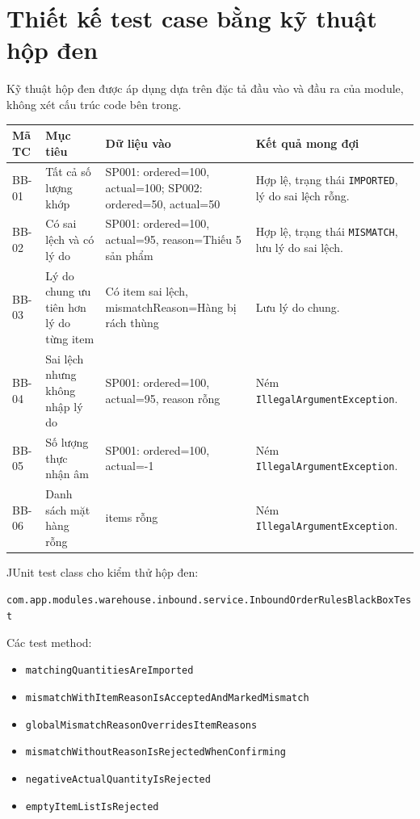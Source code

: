 \documentclass[12pt,a4paper]{article}
\begin{document}
\section{Thiết kế test case bằng kỹ thuật hộp đen}

Kỹ thuật hộp đen được áp dụng dựa trên đặc tả đầu vào và đầu ra của module, không xét cấu trúc code bên trong.

\begin{longtable}{|p{1.4cm}|p{3.4cm}|p{5.2cm}|p{4.2cm}|}
\hline
\textbf{Mã TC} & \textbf{Mục tiêu} & \textbf{Dữ liệu vào} & \textbf{Kết quả mong đợi} \\
\hline
BB-01 & Tất cả số lượng khớp & SP001: ordered=100, actual=100; SP002: ordered=50, actual=50 & Hợp lệ, trạng thái \texttt{IMPORTED}, lý do sai lệch rỗng. \\
\hline
BB-02 & Có sai lệch và có lý do & SP001: ordered=100, actual=95, reason=Thiếu 5 sản phẩm & Hợp lệ, trạng thái \texttt{MISMATCH}, lưu lý do sai lệch. \\
\hline
BB-03 & Lý do chung ưu tiên hơn lý do từng item & Có item sai lệch, mismatchReason=Hàng bị rách thùng & Lưu lý do chung. \\
\hline
BB-04 & Sai lệch nhưng không nhập lý do & SP001: ordered=100, actual=95, reason rỗng & Ném \texttt{IllegalArgumentException}. \\
\hline
BB-05 & Số lượng thực nhận âm & SP001: ordered=100, actual=-1 & Ném \texttt{IllegalArgumentException}. \\
\hline
BB-06 & Danh sách mặt hàng rỗng & items rỗng & Ném \texttt{IllegalArgumentException}. \\
\hline
\end{longtable}

JUnit test class cho kiểm thử hộp đen:

\begin{center}
\texttt{com.app.modules.warehouse.inbound.service.InboundOrderRulesBlackBoxTest}
\end{center}

Các test method:
\begin{itemize}[leftmargin=1.2cm]
    \item \texttt{matchingQuantitiesAreImported}
    \item \texttt{mismatchWithItemReasonIsAcceptedAndMarkedMismatch}
    \item \texttt{globalMismatchReasonOverridesItemReasons}
    \item \texttt{mismatchWithoutReasonIsRejectedWhenConfirming}
    \item \texttt{negativeActualQuantityIsRejected}
    \item \texttt{emptyItemListIsRejected}
\end{itemize}
\end{document}
